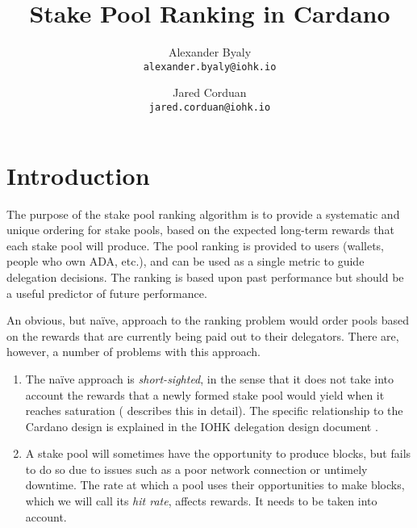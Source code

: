 \documentclass[11pt,a4paper,dvipsnames,twosided]{article}
\begin{document}
\title{Stake Pool Ranking in Cardano}

\author{Alexander Byaly  \\ {\small \texttt{alexander.byaly@iohk.io}} \\
   \and Jared Corduan  \\ {\small \texttt{jared.corduan@iohk.io}}}



\setlength{\parindent}{0pt}
\setlength{\parskip}{12pt plus 3pt minus 2pt}

\maketitle

\section{Introduction}

The purpose of the stake pool ranking algorithm is to provide a systematic and unique ordering for stake pools,
based on the expected long-term rewards that each stake pool will produce.
The pool ranking is provided to users (wallets, people who own ADA, etc.), and can be used as a single
metric to guide delegation decisions.
The ranking is based upon past performance but should be a useful predictor of future performance.

An obvious, but na\"{i}ve, approach to the ranking problem would order pools based on the rewards that are
currently being paid out to their delegators.  There are, however, a number of problems with this approach.

\begin{enumerate}
  \item
    The na\"{i}ve approach is \emph{short-sighted}, in the sense that it does not take into
    account the rewards that a newly formed stake pool would yield when it reaches saturation (\cite{bkks2018} describes this in detail).
    The specific relationship to the Cardano design is explained in the IOHK delegation design document \cite[Section 5.6]{delegation_design}.
  \item
    A stake pool will sometimes have the opportunity to produce blocks,
    but fails to do so due to issues such as a poor network connection or untimely downtime. The rate at
    which a pool uses their opportunities to make blocks, which we will call its \emph{hit rate}, affects rewards.
    It needs to be taken into account.
\end{enumerate}
\end{document}
